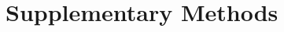\graphicspath{{./content/part_I/diff_in_graphs/figures/}}

\setcounter{equation}{0}
\setcounter{figure}{0}
\setcounter{table}{0}
\makeatletter
\renewcommand{\thetable}{S\arabic{table}}
\renewcommand{\theequation}{S\arabic{equation}}
\renewcommand{\thefigure}{S\arabic{figure}}

\section{Supplementary Methods}
    \label{secSI:supmat}

